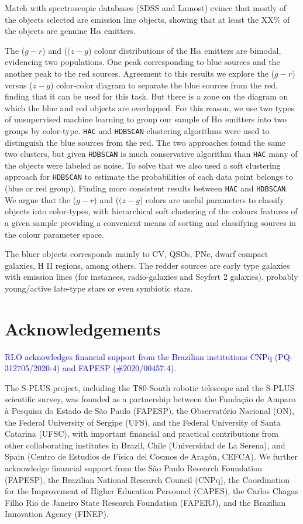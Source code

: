 \documentclass[fleqn,usenatbib]{mnras}
\newcommand{\rlopes}[1]{\textcolor{blue}{#1}}
\begin{document}
Match with spectroscopic databases (SDSS and Lamost) evince that mostly of the objects 
selected are emission line objects, showing  that at least the XX\% of the objects are 
genuine H$\alpha$ emitters. 

The ($g - r$) and ($(z - g$) colour distributions of the H{$\alpha$} emitters are bimodal, 
evidencing two populations. One peak corresponding to blue sources and the another peak to the 
red sources. Agreement to this results we explore the ($g - r$) versus ($z - g$) color-color diagram 
to separate the blue sources from the red, finding that it can be used for this task. But there is a zone 
on the diagram on which the blue and red objects are overlapped. 
For this reason, we use two types of unsupervised machine learning to group our sample of H{$\alpha$} 
emitters into two groups by color-type. \texttt{HAC} and \texttt{HDBSCAN} clustering algorithms were 
used to distinguish the blue sources from the red. The two approaches found the same two clusters, 
but given \texttt{HDBSCAN} is much conservative algorithm than  \texttt{HAC}
many of the objects were labeled as noise. To solve that we also used a soft clustering approach 
for \texttt{HDBSCAN} to estimate the probabilities of each data point belongs to (blue or red group). 
Finding more consistent results between \texttt{HAC} and \texttt{HDBSCAN}. We argue that
the ($g - r$) and ($(z - g$) colors are useful parameters to classify objects into color-types,
with hierarchical soft clustering of the colours features of a given sample providing a 
convenient means of sorting and classifying sources in the colour parameter space. 

The bluer objects corresponds mainly to  CV, QSOs, PNe, dwarf compact galaxies, H II regions, 
among others. The redder sources are early type galaxies with emission lines (for instances, 
radio-galaxies and Seyfert 2 galaxies), probably young/active late-type stars or 
even symbiotic stars. 

\section*{Acknowledgements}

\rlopes{RLO acknowledges financial support from the Brazilian institutions CNPq (PQ-312705/2020-4) and FAPESP (\#2020/00457-4).}

The S-PLUS project, including the T80-South robotic telescope and
the S-PLUS scientific survey, was founded as a partnership between the
Fundação de Amparo à Pesquisa do Estado de S\~{a}o Paulo
(FAPESP), the Observatório Nacional (ON), the Federal University of
Sergipe (UFS), and the Federal University of Santa Catarina
(UFSC), with important financial and practical contributions from
other collaborating institutes in Brazil, Chile (Universidad de La
Serena), and Spain (Centro de Estudios de Física del Cosmos de
Aragón, CEFCA). We further acknowledge financial support from
the São Paulo Research Foundation (FAPESP), the Brazilian National
Research Council (CNPq), the Coordination for the Improvement of
Higher Education Personnel (CAPES), the Carlos Chagas Filho Rio
de Janeiro State Research Foundation (FAPERJ), and the Brazilian
Innovation Agency (FINEP).
\end{document}
